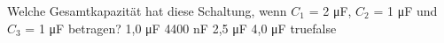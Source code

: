     {Welche Gesamtkapazität hat diese Schaltung, wenn $C_1$ = 2 \si{\micro\farad}, $C_2$ = 1 \si{\micro\farad} und $C_3$ = 1 \si{\micro\farad} betragen? }
    {1,0 \si{\micro\farad}}
    {4400 nF}
    {2,5 \si{\micro\farad}}
    {4,0 \si{\micro\farad}}
    {true}{false}